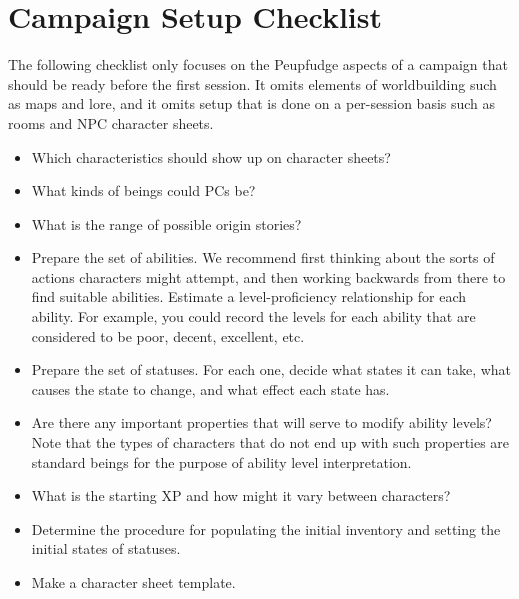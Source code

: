 \section{Campaign Setup Checklist}
The following checklist only focuses on the Peupfudge aspects of a campaign that should be ready before the first session.
It omits elements of worldbuilding such as maps and lore,
and it omits setup that is done on a per-session basis such as rooms and NPC character sheets.

\def\itemSquare{\item[$\square{}$]}

\begin{itemize}
\itemSquare
Which characteristics should show up on character sheets?
\itemSquare
What kinds of beings could PCs be?
\itemSquare
What is the range of possible origin stories?
\itemSquare
Prepare the set of abilities.
We recommend first thinking about the sorts of actions characters might attempt, and then working backwards from there to find suitable abilities.
Estimate a level-proficiency relationship for each ability.
For example, you could record the levels for each ability that are considered to be poor, decent, excellent, etc.
\itemSquare
Prepare the set of statuses.
For each one, decide what states it can take, what causes the state to change, and what effect each state has.
\itemSquare
Are there any important properties that will serve to modify ability levels?
Note that the types of characters that do not end up with such properties are standard beings for the purpose of ability level interpretation.
\itemSquare
What is the starting XP and how might it vary between characters?
\itemSquare
Determine the procedure for populating the initial inventory and setting the initial states of statuses.
\itemSquare
Make a character sheet template.
\end{itemize}
